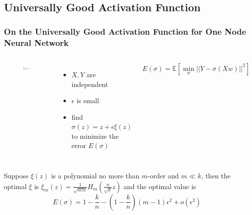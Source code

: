 \documentclass[notheorems]{beamer}
\begin{document}
\subsection{Universally Good Activation Function}
\begin{frame}
	\frametitle{\small On the Universally Good Activation Function for One Node Neural Network}
	\begin{columns}
	\begin{figure}
	\includegraphics[width=\textwidth]{./network_structure.eps}
	\end{figure}
	\begin{itemize}
		\item $X,Y$ are independent
		\item  $\epsilon$ is small
		\item find $\sigma(z) = z + \epsilon \xi(z)$ to minimize the error $E(\sigma)$
	\end{itemize}
	$$
	E(\sigma)= \mathbb{E}[\min_{w} || Y - \sigma(X w) ||^2]
	$$
	\end{columns}
	\begin{theorem}
		Suppose $\xi(z)$ is a polynomial no more than $m$-order and $m\ll k$, then the optimal $\xi$ is $\xi_m(z) = \frac{1}{\sqrt{m! n}}H_m(\frac{n}{\sqrt{k}} z)$ and the optimal value is
		$$
		E(\sigma) = 1-\frac{k}{n}  - (1-\frac{k}{n})(m-1)  \epsilon^2 + o(\epsilon^2)
		$$
		\end{theorem}
\end{frame}
\end{document}
